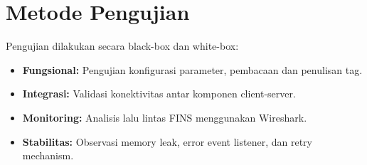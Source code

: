 \section{Metode Pengujian}
Pengujian dilakukan secara black-box dan white-box:

\begin{itemize}
    \item \textbf{Fungsional:} Pengujian konfigurasi parameter, pembacaan dan penulisan tag.
    \item \textbf{Integrasi:} Validasi konektivitas antar komponen client-server.
    \item \textbf{Monitoring:} Analisis lalu lintas FINS menggunakan Wireshark.
    \item \textbf{Stabilitas:} Observasi memory leak, error event listener, dan retry mechanism.
\end{itemize}
